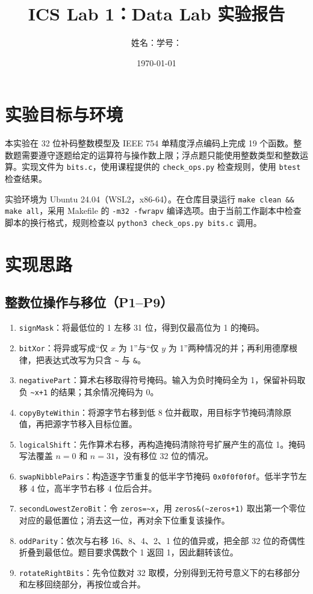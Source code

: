 \documentclass[UTF8,a4paper,11pt]{ctexart}
\title{\bfseries ICS Lab 1：Data Lab 实验报告}
\author{姓名：\underline{\hspace{4cm}}\qquad 学号：\underline{\hspace{4cm}}}
\date{\today}
\begin{document}
\maketitle

\section{实验目标与环境}
本实验在 32 位补码整数模型及 IEEE 754 单精度浮点编码上完成 19 个函数。整数题需要遵守逐题给定的运算符与操作数上限；浮点题只能使用整数类型和整数运算。实现文件为 \texttt{bits.c}，使用课程提供的 \texttt{check\_ops.py} 检查规则，使用 \texttt{btest} 检查结果。

实验环境为 Ubuntu 24.04（WSL2，x86-64）。在仓库目录运行 \texttt{make clean \&\& make all}，采用 Makefile 的 \texttt{-m32 -fwrapv} 编译选项。由于当前工作副本中检查脚本的换行格式，规则检查以 \texttt{python3 check\_ops.py bits.c} 调用。

\section{实现思路}
\subsection{整数位操作与移位（P1--P9）}
\begin{enumerate}[label=\textbf{P\arabic*.}]
  \item \texttt{signMask}：将最低位的 1 左移 31 位，得到仅最高位为 1 的掩码。
  \item \texttt{bitXor}：将异或写成“仅 \(x\) 为 1”与“仅 \(y\) 为 1”两种情况的并；再利用德摩根律，把表达式改写为只含 \texttt{\textasciitilde} 与 \texttt{\&}。
  \item \texttt{negativePart}：算术右移取得符号掩码。输入为负时掩码全为 1，保留补码取负 \texttt{\textasciitilde x+1} 的结果；其余情况掩码为 0。
  \item \texttt{copyByteWithin}：将源字节右移到低 8 位并截取，用目标字节掩码清除原值，再把源字节移入目标位置。
  \item \texttt{logicalShift}：先作算术右移，再构造掩码清除符号扩展产生的高位 1。掩码写法覆盖 \(n=0\) 和 \(n=31\)，没有移位 32 位的情况。
  \item \texttt{swapNibblePairs}：构造逐字节重复的低半字节掩码 \texttt{0x0f0f0f0f}。低半字节左移 4 位，高半字节右移 4 位后合并。
  \item \texttt{secondLowestZeroBit}：令 \texttt{zeros=\textasciitilde x}，用 \texttt{zeros\&(\textasciitilde zeros+1)} 取出第一个零位对应的最低置位；消去这一位，再对余下位重复该操作。
  \item \texttt{oddParity}：依次与右移 16、8、4、2、1 位的值异或，把全部 32 位的奇偶性折叠到最低位。题目要求偶数个 1 返回 1，因此翻转该位。
  \item \texttt{rotateRightBits}：先令位数对 32 取模，分别得到无符号意义下的右移部分和左移回绕部分，再按位或合并。
\end{enumerate}
\end{document}
